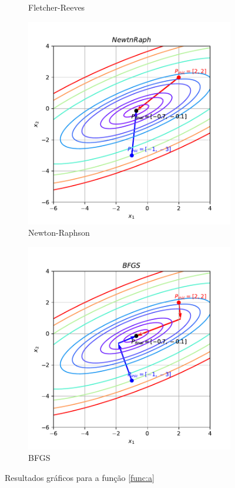 \documentclass[10pt, a4paper]{article}
\begin{document}
\begin{figure}[htpb]
\begin{subfigure}[b]{0.32\textwidth}
    \caption{Fletcher-Reeves}
    \label{fig:q1a_fletchrvs}
  \end{subfigure}
  \hfill
  \begin{subfigure}[b]{0.32\textwidth}
    \centering
    \includegraphics[width=\textwidth]{images/q1a_NewtnRaph.pdf}
    \caption{Newton-Raphson}
    \label{fig:q1a_newtnraph}
  \end{subfigure}
  \hfill
  \begin{subfigure}[b]{0.32\textwidth}
    \centering
    \includegraphics[width=\textwidth]{images/q1a_BFGS.pdf}
    \caption{BFGS}
    \label{fig:q1a_bfgs}
  \end{subfigure}
     \caption{Resultados gráficos para a função \ref{func:a}}
     \label{fig:q1a}
\end{figure}
\end{document}
